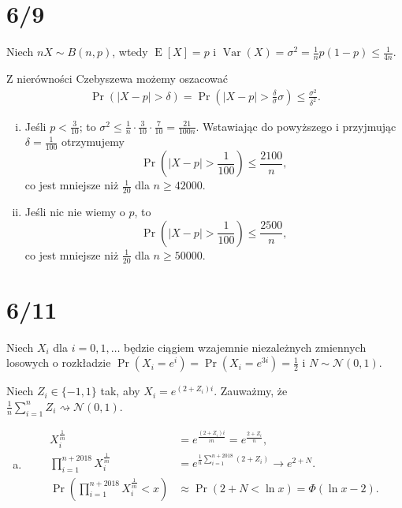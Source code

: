 \documentclass[a4paper, 12pt]{article}
\title{}
\author{Wiktor Kuchta}
\date{\vspace{-4ex}}
\DeclareMathOperator{\EX}{E}
\DeclareMathOperator{\Var}{Var}
\begin{document}
\maketitle

\section*{6/9}
Niech $nX \sim B(n,p)$, wtedy $\EX[X] = p$ i $\Var(X) = σ^2 = \frac{1}{n}p(1-p) ≤ \frac{1}{4n}$.

Z nierówności Czebyszewa możemy oszacować
\begin{align*}
	\Pr(|X-p|>δ) =
	\Pr(|X-p|>\frac{δ}{σ}σ) ≤ \frac{σ^2}{δ^2}.
\end{align*}

\begin{enumerate}[i)]
	\item
		Jeśli $p< \frac{3}{10} $; to $σ^2 ≤ \frac{1}{n} · \frac{3}{10} · \frac{7}{10} = \frac{21}{100n}.$
		Wstawiając do powyższego i przyjmując $δ= \frac{1}{100} $ otrzymujemy
		$$\Pr(|X-p|> \frac{1}{100} ) ≤ \frac{2100}{n},$$
		co jest mniejsze niż $ \frac{1}{20} $ dla $n≥42000$.
	\item Jeśli nic nie wiemy o $p$, to
		$$\Pr(|X-p|> \frac{1}{100} ) ≤ \frac{2500}{n},$$
		co jest mniejsze niż $ \frac{1}{20} $ dla $n≥50000$.
\end{enumerate}


\newpage

\section*{6/11}
Niech $X_i$ dla $i=0,1,…$ będzie ciągiem wzajemnie niezależnych zmiennych
losowych o rozkładzie $\Pr(X_i=e^i)=\Pr(X_i=e^{3i})= \frac{1}{2}$ i $N \sim \mathcal{N}(0,1)$.

Niech $Z_i ∈ \{-1,1\}$ tak, aby $X_i = e^{(2+ Z_i) i}$.
Zauważmy, że $\frac{1}{n}∑_{i=1}^n Z_i \rightsquigarrow \mathcal{N}( 0 , 1 )$.
\begin{enumerate}[a)]
	\item
		\begin{align*}
			X_i^{\frac{1}{in}} &= e^{\frac{(2+Z_i)i}{in}} = e^{\frac{2+Z_i}{n}}, \\
			∏_{i=1}^{n+2018} X_i^{\frac{1}{in}} &= e^{\frac{1}{n}∑_{i=1}^{n+2018} (2+Z_i)}
			→ e^{2+N}. \\
			\Pr\left(∏_{i=1}^{n+2018} X_i^{\frac{1}{in}} < x\right) &≈ \Pr(2+N < \ln x) = Φ\left( \ln x - 2\right).
		\end{align*}
	\iffalse
	\item
		\begin{align*}
			\frac{X_i^{\frac{1}{i\sqrt{n}}}}{e^{\frac{2}{\sqrt{n}}}} &=
				\frac{e^{\frac{(2+Z_i)i}{i\sqrt{n}}}}{e^{\frac{2}{\sqrt{n}}}} =
				e^{\frac{(2+Z_i)}{\sqrt{n}}-\frac{2}{\sqrt{n}}} = %
				e^{\frac{Z_i}{n}}, \\
			∏_{i=1}^{n+2018} \frac{X_i^{\frac{1}{i\sqrt{n}}}}{e^{\frac{2}{\sqrt{n}}}} &\rightarrow e^{N}. \\
			\Pr\left(∏_{i=1}^{n+2018} \frac{X_i^{\frac{1}{i\sqrt{n}}}}{e^{\frac{2}{\sqrt{n}}}} < x\right) &≈
			\Pr(N < \ln x) = Φ\left( \ln x \right).
		\end{align*}
	\fi
\end{enumerate}
\end{document}
